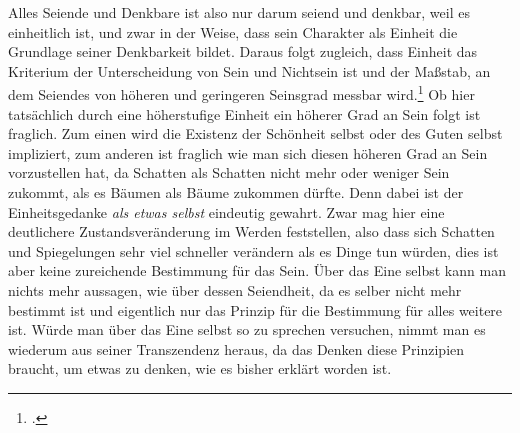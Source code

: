 Alles Seiende und Denkbare ist also nur darum seiend und denkbar, weil es einheitlich ist, und zwar in der Weise, dass sein Charakter als Einheit die Grundlage seiner Denkbarkeit bildet. Daraus folgt zugleich, dass Einheit das Kriterium der Unterscheidung von Sein und Nichtsein ist und der Maßstab, an dem Seiendes von höheren und geringeren Seinsgrad messbar wird.\footcite[vgl.][S. 99]{halfwassen2015spuren}
Ob hier tatsächlich durch eine höherstufige Einheit ein höherer Grad an Sein folgt ist fraglich. Zum einen wird die Existenz der Schönheit selbst oder des Guten selbst impliziert, zum anderen ist fraglich wie man sich diesen höheren Grad an Sein vorzustellen hat, da Schatten als Schatten nicht mehr oder weniger Sein zukommt, als es Bäumen als Bäume zukommen dürfte. Denn dabei ist der Einheitsgedanke \emph{als etwas selbst} eindeutig gewahrt. Zwar mag hier eine deutlichere Zustandsveränderung im Werden feststellen, also dass sich Schatten und Spiegelungen sehr viel schneller verändern als es Dinge tun würden, dies ist aber keine zureichende Bestimmung für das Sein. 
Über das Eine selbst kann man nichts mehr aussagen, wie über dessen Seiendheit, da es selber nicht mehr bestimmt ist und eigentlich nur das Prinzip für die Bestimmung für alles weitere ist. Würde man über das Eine selbst so zu sprechen versuchen, nimmt man es wiederum aus seiner Transzendenz heraus, da das Denken diese Prinzipien braucht, um etwas zu denken, wie es bisher erklärt worden ist.
